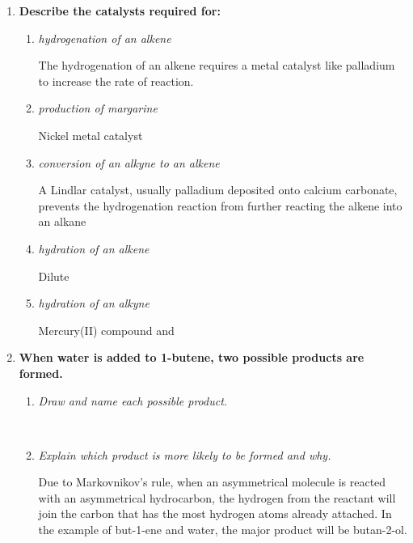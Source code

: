 \documentclass{report}
\begin{document}
\begin{enumerate}
		\item \textbf{Describe the catalysts required for:}

			\begin{enumerate}
				\item \textit{hydrogenation of an alkene}

					The hydrogenation of an alkene requires a metal catalyst like palladium to increase the rate of reaction.

				\item \textit{production of margarine}

					Nickel metal catalyst

				\item \textit{conversion of an alkyne to an alkene}

					A Lindlar catalyst, usually palladium deposited onto calcium carbonate, prevents the hydrogenation reaction from further reacting the alkene into an alkane

				\item \textit{hydration of an alkene}

					Dilute 

				\item \textit{hydration of an alkyne}

					Mercury(II) compound and 
			\end{enumerate}

		\item \textbf{When water is added to 1-butene, two possible products are formed.}

			\begin{enumerate}
				\item \textit{Draw and name each possible product.}

					\begin{center}
					\end{center}
					\\
					\begin{center}
					\end{center}

				\item \textit{Explain which product is more likely to be formed and why.}

					Due to Markovnikov's rule, when an asymmetrical molecule is reacted with an asymmetrical hydrocarbon, the hydrogen from the reactant will join the carbon that has the most hydrogen atoms already attached. In the example of but-1-ene and water, the major product will be butan-2-ol.
			\end{enumerate}


\end{enumerate}
\end{document}

